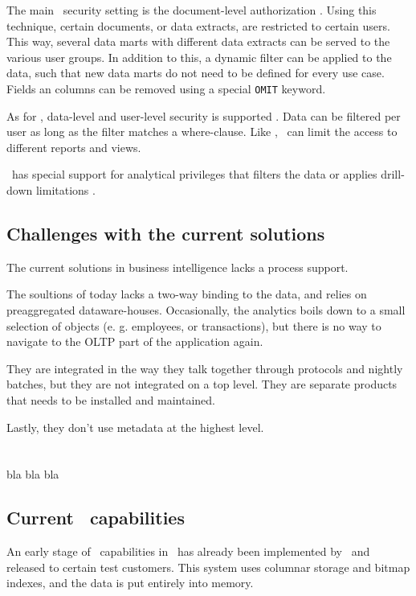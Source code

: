 The main \qlikview~security setting is the document-level authorization \cite{Qlik2011-hj}. Using this technique, certain documents, or data extracts, are restricted to certain users. This way, several data marts with different data extracts can be served to the various user groups. In addition to this, a dynamic filter can be applied to the data, such that new data marts do not need to be defined for every use case. Fields an columns can be removed using a special \texttt{OMIT} keyword.

As for \tableau, data-level and user-level security is supported \cite{Kamkolkar2015-iq}. Data can be filtered per user as long as the filter matches a where-clause. Like \qlikview, \tableau~can limit the access to different reports and views.

\saph~has special support for analytical privileges that filters the data or applies drill-down limitations \cite{Primsch2011-ij}.

\subsection{Challenges with the current solutions}
The current solutions in business intelligence lacks a process support.

The soultions of today lacks a two-way binding to the data, and relies on preaggregated dataware-houses. Occasionally, the analytics boils down to a small selection of objects (e. g. employees, or transactions), but there is no way to navigate to the OLTP part of the application again.

They are integrated in the way they talk together through protocols and nightly batches, but they are not integrated on a top level. They are separate products that needs to be installed and maintained.

Lastly, they don't use metadata at the highest level.

%
%

\section{\genusSoftware}
\label{sec:Genus Application Framework}
bla bla bla

\subsection{Current \bd~capabilities}
\label{sub:Current Business Discovery Capabilities}
An early stage of \bd~capabilities in \genusSoftware~has already been implemented by \genus~and released to certain test customers. This system uses columnar storage and bitmap indexes, and the data is put entirely into memory.


